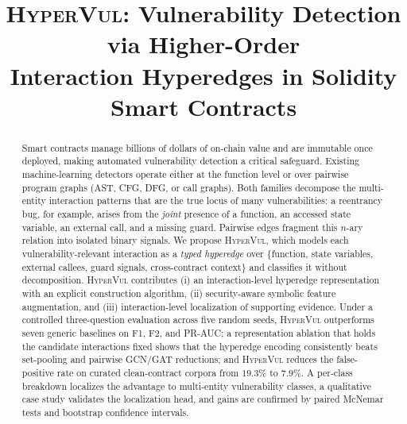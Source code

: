 \documentclass[conference]{IEEEtran}
\newcommand{\hypervul}{\textsc{HyperVul}}
\begin{document}
\title{\hypervul{}: Vulnerability Detection via Higher-Order\\
Interaction Hyperedges in Solidity Smart Contracts}

\author{
}

\maketitle

\begin{abstract}
Smart contracts manage billions of dollars of on-chain value and are immutable once
deployed, making automated vulnerability detection a critical safeguard. Existing
machine-learning detectors operate either at the function level or over pairwise
program graphs (AST, CFG, DFG, or call graphs). Both families decompose the
multi-entity interaction patterns that are the true locus of many vulnerabilities:
a reentrancy bug, for example, arises from the \emph{joint} presence of a function,
an accessed state variable, an external call, and a missing guard. Pairwise edges
fragment this $n$-ary relation into isolated binary signals. We propose \hypervul{},
which models each vulnerability-relevant interaction as a \emph{typed hyperedge} over
\{function, state variables, external callees, guard signals, cross-contract context\}
and classifies it without decomposition. \hypervul{} contributes (i) an
interaction-level hyperedge representation with an explicit construction algorithm,
(ii) security-aware symbolic feature augmentation, and (iii) interaction-level
localization of supporting evidence. Under a controlled three-question evaluation
across five random seeds, \hypervul{} outperforms seven generic baselines on F1, F2,
and PR-AUC; a representation ablation that holds the candidate interactions fixed
shows that the hyperedge encoding consistently beats set-pooling and pairwise GCN/GAT
reductions; and \hypervul{} reduces the false-positive rate on curated clean-contract
corpora from $19.3\%$ to $7.9\%$. A per-class breakdown localizes the advantage to
multi-entity vulnerability classes, a qualitative case study validates the
localization head, and gains are confirmed by paired McNemar tests and bootstrap
confidence intervals.
\end{abstract}
\end{document}
